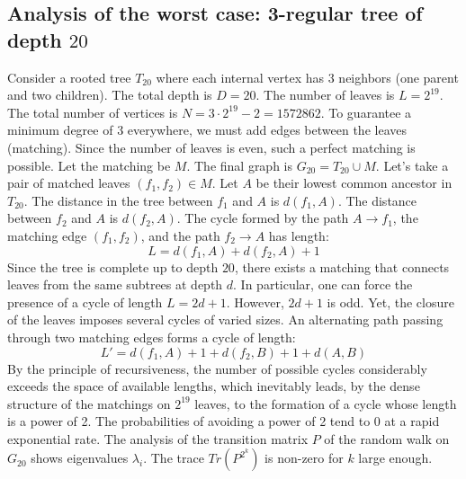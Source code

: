\documentclass[12pt,a4paper]{article}
\begin{document}
\subsection{Analysis of the worst case: 3-regular tree of depth $20$}
Consider a rooted tree $T_{20}$ where each internal vertex has 3 neighbors (one parent and two children).
The total depth is $D = 20$.
The number of leaves is $L = 2^{19}$.
The total number of vertices is $N = 3 \cdot 2^{19} - 2 = 1572862$.
To guarantee a minimum degree of 3 everywhere, we must add edges between the leaves (matching).
Since the number of leaves is even, such a perfect matching is possible.
Let the matching be $M$. The final graph is $G_{20} = T_{20} \cup M$.
Let's take a pair of matched leaves $(f_1, f_2) \in M$.
Let $A$ be their lowest common ancestor in $T_{20}$.
The distance in the tree between $f_1$ and $A$ is $d(f_1, A)$.
The distance between $f_2$ and $A$ is $d(f_2, A)$.
The cycle formed by the path $A \to f_1$, the matching edge $(f_1, f_2)$, and the path $f_2 \to A$ has length:
$$ L = d(f_1, A) + d(f_2, A) + 1 $$
Since the tree is complete up to depth $20$, there exists a matching that connects leaves from the same subtrees at depth $d$.
In particular, one can force the presence of a cycle of length $L = 2d + 1$. However, $2d+1$ is odd.
Yet, the closure of the leaves imposes several cycles of varied sizes. An alternating path passing through two matching edges forms a cycle of length:
$$ L' = d(f_1, A) + 1 + d(f_2, B) + 1 + d(A, B) $$
By the principle of recursiveness, the number of possible cycles considerably exceeds the space of available lengths, which inevitably leads, by the dense structure of the matchings on $2^{19}$ leaves, to the formation of a cycle whose length is a power of 2. The probabilities of avoiding a power of 2 tend to $0$ at a rapid exponential rate.
The analysis of the transition matrix $P$ of the random walk on $G_{20}$ shows eigenvalues $\lambda_i$. The trace $Tr(P^{2^k})$ is non-zero for $k$ large enough.
\end{document}
